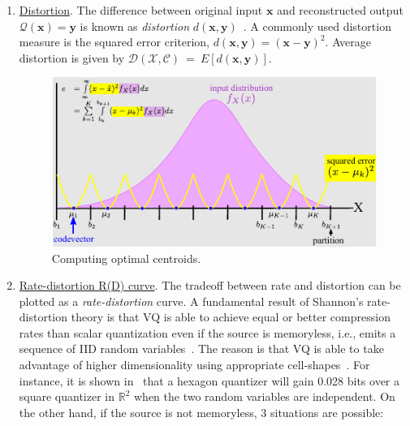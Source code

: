 \begin{enumerate}
\item \underline{Distortion}.  The difference between original input $\mathbf{x}$ and reconstructed output $\mathcal{Q}(\mathbf{x})=\mathbf{y}$ is known as \emph{distortion} $d(\mathbf{x}, \mathbf{y})$~\cite{2005_BOOK_DataCompression_Sayood}.  A commonly used distortion measure is the squared error criterion, $d(\mathbf{x}, \mathbf{y})=(\mathbf{x}-\mathbf{y})^2$.  Average distortion is given by $\mathcal{D(\mathcal{X}, \mathcal{C})}~=~E\left[d(\mathbf{x}, \mathbf{y}) \right]$.  




								\begin{figure}[t]			
								\includegraphics[width=1\textwidth]{thesis/Quantization_MSE.pdf}
								\caption{Computing optimal centroids.}
								\label{fig:computing_optimal_centroids}	
								\end{figure}




\item \underline{Rate-distortion R(D) curve}.  The tradeoff between rate and distortion can be plotted as a \emph{rate-distortion} curve.  A fundamental result of Shannon's rate-distortion theory is that VQ is able to achieve equal or better compression rates than scalar quantization even if the source is memoryless, i.e., emits a sequence of IID random variables~\cite{1984_JNL_VQ_Gray}.   The reason is that VQ is able to take advantage of higher dimensionality using appropriate cell-shapes~\cite{1985_JNL_VQ_Makhoul}.  For instance, it is shown in~\cite{1985_JNL_VQ_Makhoul} that a hexagon quantizer will gain 0.028 bits over a square quantizer in $\mathbb{R}^2$ when the two random variables are independent.  On the other hand, if the source is not memoryless, 3 situations are possible:


\end{enumerate}
